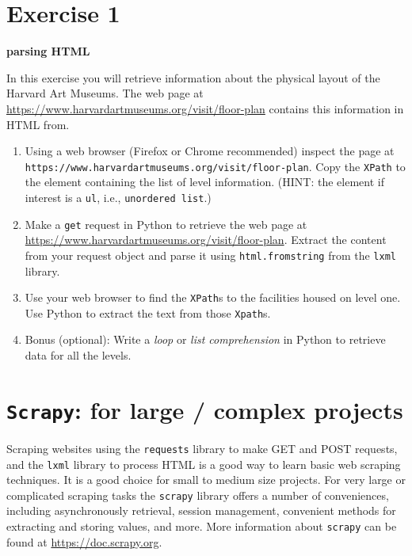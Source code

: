 \documentclass[]{book}
\providecommand{\tightlist}{%
  \setlength{\itemsep}{0pt}\setlength{\parskip}{0pt}}
\begin{document}
\hypertarget{exercise-1-5}{%
\section{Exercise 1}\label{exercise-1-5}}

\textbf{parsing HTML}

In this exercise you will retrieve information about the physical
layout of the Harvard Art Museums. The web page at
\url{https://www.harvardartmuseums.org/visit/floor-plan} contains this
information in HTML from.

\begin{enumerate}
\def\labelenumi{\arabic{enumi}.}
\tightlist
\item
  Using a web browser (Firefox or Chrome recommended) inspect the
  page at \texttt{https://www.harvardartmuseums.org/visit/floor-plan}. Copy
  the \texttt{XPath} to the element containing the list of level
  information. (HINT: the element if interest is a \texttt{ul}, i.e.,
  \texttt{unordered\ list}.)
\item
  Make a \texttt{get} request in Python to retrieve the web page at
  \url{https://www.harvardartmuseums.org/visit/floor-plan}. Extract the
  content from your request object and parse it using \texttt{html.fromstring}
  from the \texttt{lxml} library.
\item
  Use your web browser to find the \texttt{XPath}s to the facilities housed on
  level one. Use Python to extract the text from those \texttt{Xpath}s.
\item
  Bonus (optional): Write a \emph{loop} or \emph{list comprehension} in Python
  to retrieve data for all the levels.
\end{enumerate}

\hypertarget{scrapy-for-large-complex-projects}{%
\section{\texorpdfstring{\texttt{Scrapy}: for large / complex projects}{Scrapy: for large / complex projects}}\label{scrapy-for-large-complex-projects}}

Scraping websites using the \texttt{requests} library to make GET and POST
requests, and the \texttt{lxml} library to process HTML is a good way to
learn basic web scraping techniques. It is a good choice for small to
medium size projects. For very large or complicated scraping tasks the
\texttt{scrapy} library offers a number of conveniences, including
asynchronously retrieval, session management, convenient methods for
extracting and storing values, and more. More information about
\texttt{scrapy} can be found at \url{https://doc.scrapy.org}.
\end{document}
